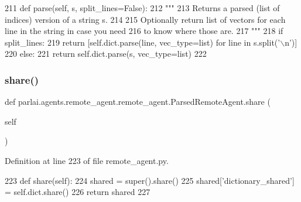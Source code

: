 \begin{DoxyCode}
211     \textcolor{keyword}{def }parse(self, s, split\_lines=False):
212         \textcolor{stringliteral}{"""}
213 \textcolor{stringliteral}{        Returns a parsed (list of indices) version of a string s.}
214 \textcolor{stringliteral}{}
215 \textcolor{stringliteral}{        Optionally return list of vectors for each line in the string in case you need}
216 \textcolor{stringliteral}{        to know where those are.}
217 \textcolor{stringliteral}{        """}
218         \textcolor{keywordflow}{if} split\_lines:
219             \textcolor{keywordflow}{return} [self.dict.parse(line, vec\_type=list) \textcolor{keywordflow}{for} line \textcolor{keywordflow}{in} s.split(\textcolor{stringliteral}{'\(\backslash\)n'})]
220         \textcolor{keywordflow}{else}:
221             \textcolor{keywordflow}{return} self.dict.parse(s, vec\_type=list)
222 
\end{DoxyCode}
\mbox{\label{classparlai_1_1agents_1_1remote__agent_1_1remote__agent_1_1ParsedRemoteAgent_a6e65666f3754929df13beb82824d4a20}} 
\subsubsection{\texorpdfstring{share()}{share()}}
{\footnotesize\ttfamily def parlai.\+agents.\+remote\+\_\+agent.\+remote\+\_\+agent.\+Parsed\+Remote\+Agent.\+share (\begin{DoxyParamCaption}\item[{}]{self }\end{DoxyParamCaption})}



Definition at line 223 of file remote\+\_\+agent.\+py.


\begin{DoxyCode}
223     \textcolor{keyword}{def }share(self):
224         shared = super().share()
225         shared[\textcolor{stringliteral}{'dictionary\_shared'}] = self.dict.share()
226         \textcolor{keywordflow}{return} shared
227 \end{DoxyCode}


